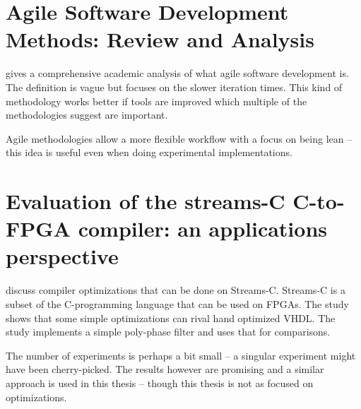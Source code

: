 \section{Agile Software Development Methods: Review and Analysis}
\citeauthor{src:Agile} gives a comprehensive academic analysis of what agile software development is. The definition is vague but focuses on the slower iteration times. This kind of methodology works better if tools are improved which multiple of the methodologies suggest are important. \cite{src:Agile}

Agile methodologies allow a more flexible workflow with a focus on being lean -- this idea is useful even when doing experimental implementations.

\section{Evaluation of the streams-C C-to-FPGA compiler: an applications perspective}
\citeauthor{src:ConFPGA} discuss compiler optimizations that can be done on Streams-C. Streams-C is a subset of the C-programming language that can be used on FPGAs. The study shows that some simple optimizations can rival hand optimized VHDL. The study implements a simple poly-phase filter and uses that for comparisons. \cite{src:ConFPGA}

The number of experiments is perhaps a bit small -- a singular experiment might have been cherry-picked. The results however are promising and a similar approach is used in this thesis -- though this thesis is not as focused on optimizations.


